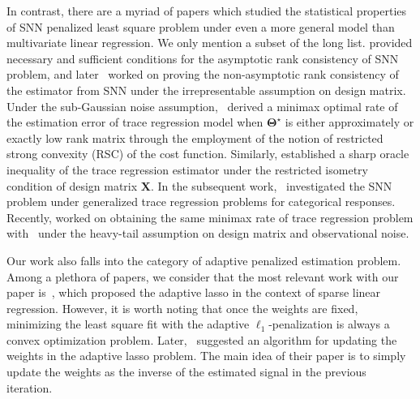\documentclass[alpha-refs]{wiley-article}
\begin{document}
In contrast, there are a myriad of papers which studied the statistical properties of SNN penalized least square problem under even a more general model than multivariate linear regression.
We only mention a subset of the long list.
\citet{bach2008consistency} provided necessary and sufficient conditions for the asymptotic rank consistency of SNN problem, and later~\citet{lee2015model} worked on proving the non-asymptotic rank consistency of the estimator from SNN under the irrepresentable assumption on design matrix.
Under the sub-Gaussian noise assumption,~\citet{negahban2011estimation} derived a minimax optimal rate of the estimation error of trace regression model when $\boldsymbol{\Theta}^{\star}$ is either approximately or exactly low rank matrix through the employment of the notion of restricted strong convexity (RSC) of the cost function.
Similarly, \citet{koltchinskii2011nuclear} established a sharp oracle inequality of the trace regression estimator under the restricted isometry condition of design matrix $\boldsymbol{X}$.
In the subsequent work,~\citet{fan2019generalized} investigated the SNN problem under generalized trace regression problems for categorical responses.
Recently, \citet{fan2021shrinkage} worked on obtaining the same minimax rate of trace regression problem with~\citet{negahban2011estimation} under the heavy-tail assumption on design matrix and observational noise.

Our work also falls into the category of adaptive penalized estimation problem.
Among a plethora of papers, we consider that the most relevant work with our paper is~\citet{zou2006adaptive}, which proposed the adaptive lasso in the context of sparse linear regression.
However, it is worth noting that once the weights are fixed, minimizing the least square fit with the adaptive $\ell_{1}$-penalization is always a convex optimization problem.
Later,~\citet{candes2008enhancing} suggested an algorithm for updating the weights in the adaptive lasso problem.
The main idea of their paper is to simply update the weights as the inverse of the estimated signal in the previous iteration.
\end{document}
